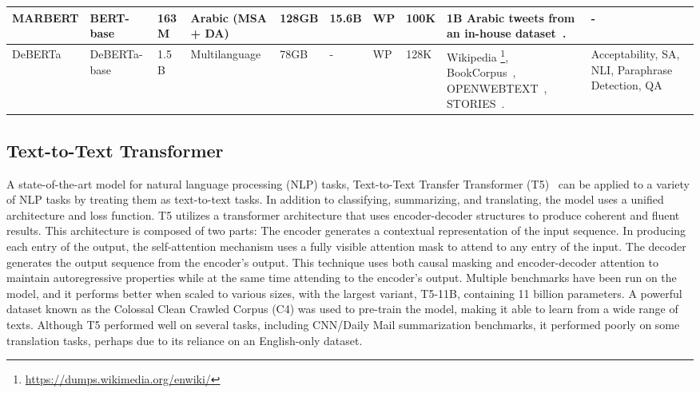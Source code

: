 \begin{table*}[t]
{\begin{tabular}{|m{2.5cm}|m{2cm}|m{2cm}|m{2.2cm}|m{1.5cm}|m{1.5cm}|m{1.5cm}|m{1.5cm}|m{5cm}|m{3cm}|}
\hline
MARBERT & BERT-base & 163 M & Arabic (MSA + DA) & 128GB & 15.6B & WP & 100K & 1B Arabic tweets from an in-house dataset~\cite{abdul2020arbert}. & - \\ 
\hline
DeBERTa & DeBERTa-base & 1.5 B & Multilanguage & 78GB & - & WP & 128K & Wikipedia \footnote{\url{https://dumps.wikimedia.org/enwiki/}}, BookCorpus~\cite{zhu2015aligning}, OPENWEBTEXT~\cite{gokaslanopenwebtext}, STORIES~\cite{trinh2018simple}. & Acceptability, SA, NLI, Paraphrase Detection, QA \\ 
\hline
\end{tabular}
}
\end{table*}








\subsection{Text-to-Text Transformer}

A state-of-the-art model for natural language processing (NLP) tasks, Text-to-Text Transfer Transformer (T5)~\cite{raffel2020exploring} can be applied to a variety of NLP tasks by treating them as text-to-text tasks. In addition to classifying, summarizing, and translating, the model uses a unified architecture and loss function. T5 utilizes a transformer architecture that uses encoder-decoder structures to produce coherent and fluent results. This architecture is composed of two parts: The encoder generates a contextual representation of the input sequence. In producing each entry of the output, the self-attention mechanism uses a fully visible attention mask to attend to any entry of the input. The decoder generates the output sequence from the encoder's output. This technique uses both causal masking and encoder-decoder attention to maintain autoregressive properties while at the same time attending to the encoder's output. Multiple benchmarks have been run on the model, and it performs better when scaled to various sizes, with the largest variant, T5-11B, containing 11 billion parameters. A powerful dataset known as the Colossal Clean Crawled Corpus (C4) was used to pre-train the model, making it able to learn from a wide range of texts. Although T5 performed well on several tasks, including CNN/Daily Mail summarization benchmarks, it performed poorly on some translation tasks, perhaps due to its reliance on an English-only dataset.

